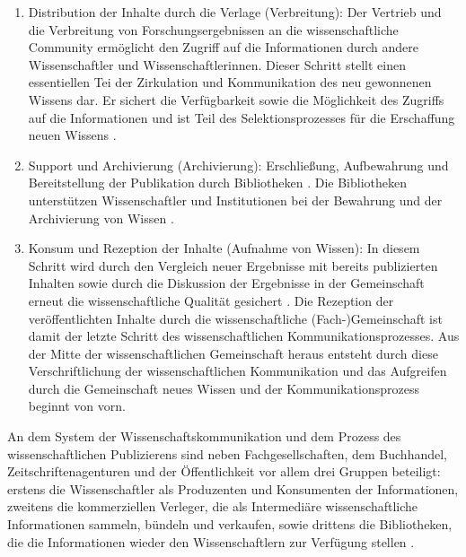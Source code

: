 \begin{enumerate}
\item Distribution der Inhalte durch die Verlage (Verbreitung): Der Vertrieb und die Verbreitung von Forschungsergebnissen an die wissenschaftliche Community ermöglicht den Zugriff auf die Informationen durch andere Wissenschaftler und Wissenschaftlerinnen. Dieser Schritt stellt einen essentiellen Tei der Zirkulation und Kommunikation des neu gewonnenen Wissens dar. Er sichert die Verfügbarkeit sowie die Möglichkeit des Zugriffs auf die Informationen und ist Teil des Selektionsprozesses für die Erschaffung neuen Wissens \cite{Nosek_2015}.
\item Support und Archivierung (Archivierung): Erschließung, Aufbewahrung und Bereitstellung der Publikation durch Bibliotheken \cite{Schirmbacher_2009}. Die Bibliotheken unterstützen Wissenschaftler und Institutionen bei der Bewahrung und der Archivierung von Wissen \cite{Koelbel_2002}.
\item Konsum und Rezeption der Inhalte (Aufnahme von Wissen): In diesem Schritt wird durch den Vergleich neuer Ergebnisse mit bereits publizierten Inhalten sowie durch die Diskussion der Ergebnisse in der Gemeinschaft erneut die wissenschaftliche Qualität gesichert \cite{Umstaetter_2007}. Die Rezeption der veröffentlichten Inhalte durch die wissenschaftliche (Fach-)Gemeinschaft ist damit der letzte Schritt des wissenschaftlichen Kommunikationsprozesses. Aus der Mitte der wissenschaftlichen Gemeinschaft heraus entsteht durch diese Verschriftlichung der wissenschaftlichen Kommunikation und das Aufgreifen durch die Gemeinschaft neues Wissen \cite{Schirmbacher_2009} und der Kommunikationsprozess beginnt von vorn.
\end{enumerate}

An dem System der Wissenschaftskommunikation und dem Prozess des wissenschaftlichen Publizierens sind neben Fachgesellschaften, dem Buchhandel, Zeitschriftenagenturen und der Öffentlichkeit \cite[:6]{Seidenfaden_2005} vor allem drei Gruppen beteiligt: erstens die Wissenschaftler als Produzenten und Konsumenten der Informationen, zweitens die kommerziellen Verleger, die als Intermediäre wissenschaftliche Informationen sammeln, bündeln und verkaufen, sowie drittens die Bibliotheken, die die Informationen wieder den Wissenschaftlern zur Verfügung stellen \cite{Odlyzko_1997}.

